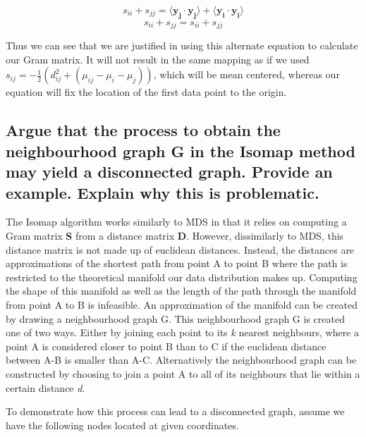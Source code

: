 \documentclass[11pt,a4paper,landscape]{article}
\begin{document}
$$ s_{ii} + s_{jj} = \langle \mathbf{y_{j}} \cdot \mathbf{y_{j}} \rangle + \langle \mathbf{y_{i}} \cdot \mathbf{y_{i}} \rangle$$
$$ s_{ii} + s_{jj} = s_{ii} + s_{jj} $$

Thus we can see that we are justified in using this alternate equation to calculate our Gram matrix. It will not result in the same mapping as if we used $ s_{ij} = -\frac{1}{2}(d^{2}_{ij} +( \mu_{ij} - \mu_{i} - \mu_{j}))$, which will be mean centered, whereas our equation will fix the location of the first data point to the origin.


\subsection{Argue that the process to obtain the neighbourhood graph G in the Isomap method may yield a disconnected graph.  Provide an example.  Explain why this is problematic.}

The Isomap algorithm works similarly to MDS in that it relies on computing a Gram matrix \textbf{S} from a distance matrix \textbf{D}. However, dissimilarly to MDS, this distance matrix is not made up of euclidean distances. Instead, the distances are approximations of the shortest path from point A to point B where the path is restricted to the theoretical manifold our data distribution makes up. Computing the shape of this manifold as well as the length of the path through the manifold from point A to B is infeasible. An approximation of the manifold can be created by drawing a neighbourhood graph G. This neighbourhood graph G is created one of two ways. Either by joining each point to its \textit{k} nearest neighbours, where a point A is considered closer to point B than to C if the euclidean distance between A-B is smaller than A-C.  Alternatively the neighbourhood graph can be constructed by choosing to join a point A to all of its neighbours that lie within a certain distance \textit{d}.\newline


To demonstrate how this process can lead to a disconnected graph,  assume we have the following nodes located at given coordinates.

\end{document}
